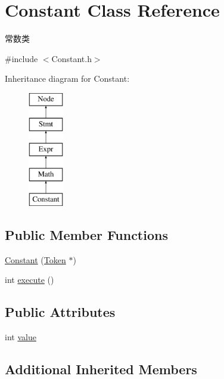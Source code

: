 \hypertarget{class_constant}{}\section{Constant Class Reference}
\label{class_constant}


常数类  




{\ttfamily \#include $<$Constant.\+h$>$}

Inheritance diagram for Constant\+:\begin{figure}[H]
\begin{center}
\leavevmode
\includegraphics[height=5.000000cm]{class_constant}
\end{center}
\end{figure}
\subsection*{Public Member Functions}
\begin{DoxyCompactItemize}
\item 
\hyperlink{class_constant_ad227bb35513aab43d86572343a1fe564}{Constant} (\hyperlink{class_token}{Token} $\ast$)
\item 
int \hyperlink{class_constant_ab5c55607bcff5ce70131a588b6bdbed7}{execute} ()
\end{DoxyCompactItemize}
\subsection*{Public Attributes}
\begin{DoxyCompactItemize}
\item 
int \hyperlink{class_constant_a132c9bc0ec98681bcbf723d87ddd722d}{value}
\end{DoxyCompactItemize}
\subsection*{Additional Inherited Members}


